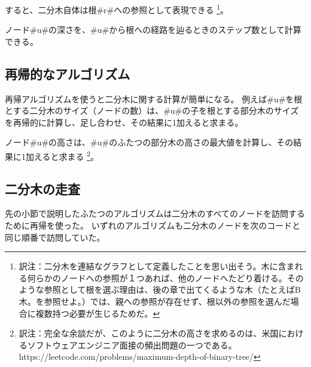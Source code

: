 すると、二分木自体は根#r#への参照として表現できる
\footnote{訳注：二分木を連結なグラフとして定義したことを思い出そう。木に含まれる何らかのノードへの参照が１つあれば、他のノードへたどり着ける。そのような参照として根を選ぶ理由は、後の章で出てくるような木（たとえばB木。を参照せよ。）では、親への参照が存在せず、根以外の参照を選んだ場合に複数持つ必要が生じるためだ。}。

ノード#u#の深さを、#u#から根への経路を辿るときのステップ数として計算できる。


\subsection{再帰的なアルゴリズム}

%
再帰アルゴリズムを使うと二分木に関する計算が簡単になる。
例えば#u#を根とする二分木のサイズ（ノードの数）は、#u#の子を根とする部分木のサイズを再帰的に計算し、足し合わせ、その結果に1加えると求まる。


ノード#u#の高さは、#u#のふたつの部分木の高さの最大値を計算し、その結果に1加えると求まる
\footnote{訳注：完全な余談だが、このように二分木の高さを求めるのは、米国におけるソフトウェアエンジニア面接の頻出問題の一つである。https://leetcode.com/problems/maximum-depth-of-binary-tree/ }。


\subsection{二分木の走査}

%
%
%
先の小節で説明したふたつのアルゴリズムは二分木のすべてのノードを訪問するために再帰を使った。
いずれのアルゴリズムも二分木のノードを次のコードと同じ順番で訪問していた。

